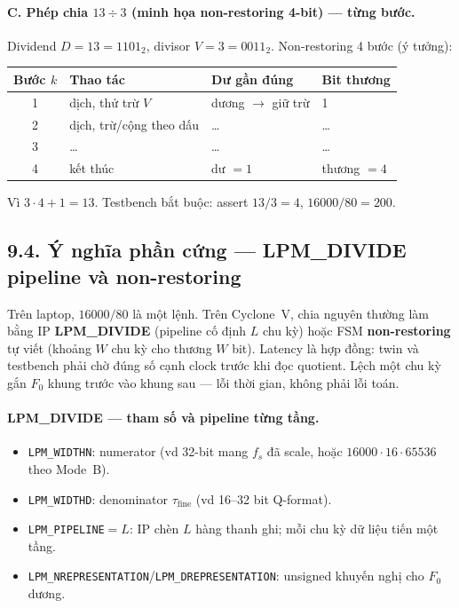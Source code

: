 \paragraph{C. Phép chia $13\div 3$ (minh họa non-restoring 4-bit) --- từng bước.}
Dividend $D = 13 = 1101_2$, divisor $V = 3 = 0011_2$. Non-restoring 4 bước (ý tưởng):
\begin{center}\small
\begin{tabular}{@{}clll@{}}\toprule
Bước $k$ & Thao tác & Dư gần đúng & Bit thương \\
\midrule
1 & dịch, thử trừ $V$ & dương $\to$ giữ trừ & 1 \\
2 & dịch, trừ/cộng theo dấu & \ldots & \ldots \\
3 & \ldots & \ldots & \ldots \\
4 & kết thúc & dư $=1$ & thương $=4$ \\
\bottomrule
\end{tabular}
\end{center}
Vì $3\cdot 4 + 1 = 13$. Testbench bắt buộc: assert $13/3 = 4$, $16000/80 = 200$.

\subsection*{9.4. Ý nghĩa phần cứng --- LPM\_DIVIDE pipeline và non-restoring}

Trên laptop, $16000/80$ là một lệnh. Trên Cyclone~V, chia nguyên thường làm bằng IP \textbf{LPM\_DIVIDE} (pipeline cố định $L$ chu kỳ) hoặc FSM \textbf{non-restoring} tự viết (khoảng $W$ chu kỳ cho thương $W$ bit). Latency là hợp đồng: twin và testbench phải chờ đúng số cạnh clock trước khi đọc quotient. Lệch một chu kỳ gắn $F_0$ khung trước vào khung sau --- lỗi thời gian, không phải lỗi toán.

\paragraph{LPM\_DIVIDE --- tham số và pipeline từng tầng.}
\begin{itemize}[leftmargin=1.4em]
\item \texttt{LPM\_WIDTHN}: numerator (vd 32-bit mang $f_s$ đã scale, hoặc $16000\cdot 16\cdot 65536$ theo Mode~B).
\item \texttt{LPM\_WIDTHD}: denominator $\tau_{\mathrm{fine}}$ (vd 16--32 bit Q-format).
\item \texttt{LPM\_PIPELINE}$=L$: IP chèn $L$ hàng thanh ghi; mỗi chu kỳ dữ liệu tiến một tầng.
\item \texttt{LPM\_NREPRESENTATION}/\texttt{LPM\_DREPRESENTATION}: unsigned khuyến nghị cho $F_0$ dương.
\end{itemize}

